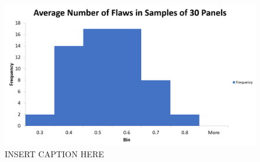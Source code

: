 \documentclass[letterpaper]{article}
\begin{document}
\subsection{}%

\section{}%

\subsection{}%

\begin{figure}[H]
 \centering
 \includegraphics[width=\textwidth]{q5.png}
 \caption{INSERT CAPTION HERE}
 \label{5a}
\end{figure}

\subsection{}%
\end{document}
